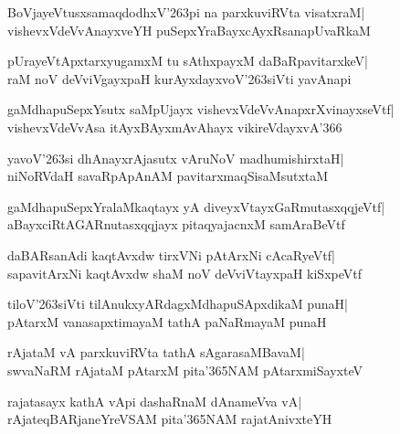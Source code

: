 \documentclass[twoside,12pt,openright]{book}
\def\S{\char'263}
\newcounter{shloka}[chapter]
\begin{document}
\begin{shloka}%
BoVjayeVtusxsamaqdodhxV\S pi na parxkuviRVta visatxraM|\\
vishevxVdeVvAnayxveYH puSepxYraBayxcAyxRsanapUvaRkaM
\end{shloka}

\begin{shloka}%
pUrayeVtApxtarxyugamxM tu sAthxpayxM daBaRpavitarxkeV|\\
raM noV deVviVgayxpaH kurAyxdayxvoV\S siVti yavAnapi
\end{shloka}

\begin{shloka}%
gaMdhapuSepxYsutx saMpUjayx vishevxVdeVvAnapxrXvinayxseVtf|\\
vishevxVdeVvAsa itAyxBAyxmAvAhayx vikireVdayxvA\char'366
\end{shloka}

\begin{shloka}%
yavoV\S si dhAnayxrAjasutx vAruNoV madhumishirxtaH|\\
niNoRVdaH savaRpApAnAM pavitarxmaqSisaMsutxtaM
\end{shloka}

\begin{shloka}%
gaMdhapuSepxYralaMkaqtayx yA diveyxVtayxGaRmutasxqqjeVtf|\\
aBayxciRtAGARnutasxqqjayx pitaqyajacnxM samAraBeVtf
\end{shloka}

\begin{shloka}%
daBARsanAdi kaqtAvxdw tirxVNi pAtArxNi cAcaRyeVtf|\\
sapavitArxNi kaqtAvxdw shaM noV deVviVtayxpaH kiSxpeVtf
\end{shloka}

\begin{shloka}%
tiloV\S siVti tilAnukxyARdagxMdhapuSApxdikaM punaH|\\
pAtarxM vanasapxtimayaM tathA paNaRmayaM punaH
\end{shloka}

\begin{shloka}%
rAjataM vA parxkuviRVta tathA sAgarasaMBavaM|\\
swvaNaRM rAjataM pAtarxM pita\char'365NAM pAtarxmiSayxteV
\end{shloka}

\begin{shloka}%
rajatasayx kathA vApi dashaRnaM dAnameVva vA|\\
rAjateqBARjaneYreVSAM pita\char'365NAM rajatAnivxteYH
\end{shloka}
\end{document}
